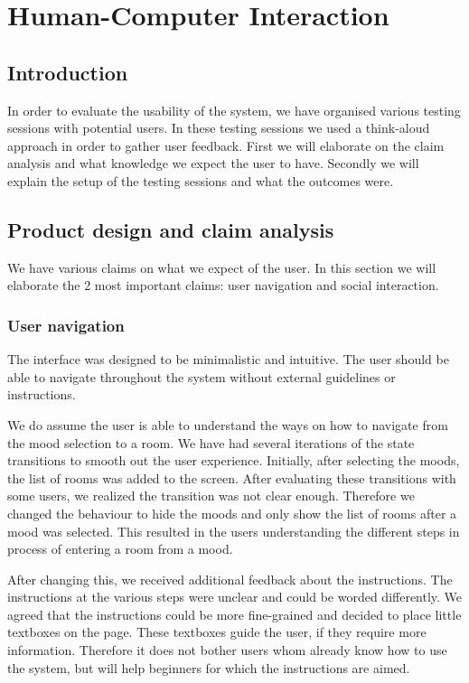 \chapter{Human-Computer Interaction}

\section{Introduction}
In order to evaluate the usability of the system, we have organised various testing sessions with potential users.
In these testing sessions we used a think-aloud approach in order to gather user feedback.
First we will elaborate on the claim analysis and what knowledge we expect the user to have.
Secondly we will explain the setup of the testing sessions and what the outcomes were.

\section{Product design and claim analysis}
We have various claims on what we expect of the user.
In this section we will elaborate the 2 most important claims: user navigation and social interaction.

\subsection{User navigation}

The interface was designed to be minimalistic and intuitive.
The user should be able to navigate throughout the system without external guidelines or instructions.

We do assume the user is able to understand the ways on how to navigate from the mood selection to a room.
We have had several iterations of the state transitions to smooth out the user experience.
Initially, after selecting the moods, the list of rooms was added to the screen.
After evaluating these transitions with some users, we realized the transition was not clear enough.
Therefore we changed the behaviour to hide the moods and only show the list of rooms after a mood was selected.
This resulted in the users understanding the different steps in process of entering a room from a mood.

After changing this, we received additional feedback about the instructions.
The instructions at the various steps were unclear and could be worded differently.
We agreed that the instructions could be more fine-grained and decided to place little textboxes on the page.
These textboxes guide the user, if they require more information.
Therefore it does not bother users whom already know how to use the system, but will help beginners for which the instructions are aimed.

